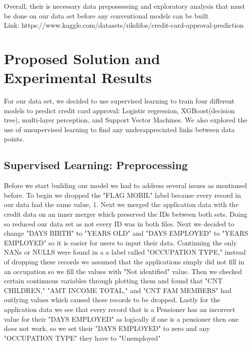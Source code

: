 \documentclass[12pt]{article}
\begin{document}
\noindent Overall, their is necessary data prepossessing and exploratory analysis that must be done on our data set before any conventional models can be built\\

Link: https://www.kaggle.com/datasets/rikdifos/credit-card-approval-prediction\\

\section{Proposed Solution and Experimental Results}

\noindent For our data set, we decided to use supervised learning to train four different models to predict credit card approval: Logistic regression, XGBoost(decision tree), multi-layer perception, and Support Vector Machines. We also explored the use of unsupervised learning to find any underappreciated links between data points.\\

\subsection{Supervised Learning: Preprocessing}

\noindent Before we start building our model we had to address several issues as mentioned before. To begin we dropped the "FLAG MOBIL" label because every record in our data had the same value, 1. Next we merged the application data with the credit data on an inner merger which preserved the IDs between both sets. Doing so reduced our data set as not every ID  was in both files. Next we decided to change "DAYS BIRTH" to "YEARS OLD" and "DAYS EMPLOYED" to "YEARS EMPLOYED" so it is easier for users to input their data. Continuing the only NANs or NULLS were found in a a label called "OCCUPATION TYPE," instead of dropping these records we assumed that the applications simply did not fill in an occupation so we fill the values with "Not identified" value. Then we checked certain continuous variables through plotting them and found that "CNT CHILDREN," "AMT INCOME TOTAL," and "CNT FAM MEMBERS" had outlying values which caused these records to be dropped. Lastly for the application data we see that every record that is a Pensioner has an incorrect value for their "DAYS EMPLOYED" as logically if one is a pensioner then one does not work, so we set their "DAYS EMPLOYED" to zero and any "OCCUPATION TYPE" they have to "Unemployed"\\
\end{document}
